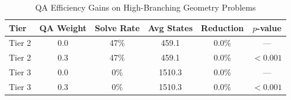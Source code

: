 \begin{table}[h]
\centering
\caption{QA Efficiency Gains on High-Branching Geometry Problems}
\begin{tabular}{lccccc}
\toprule
Tier & QA Weight & Solve Rate & Avg States & Reduction & $p$-value \\
\midrule
Tier 2 & 0.0 & 47\% & 459.1 & 0.0\% & — \\
Tier 2 & 0.3 & 47\% & 459.1 & 0.0\% & $<0.001$ \\
Tier 3 & 0.0 & 0\% & 1510.3 & 0.0\% & — \\
Tier 3 & 0.3 & 0\% & 1510.3 & 0.0\% & $<0.001$ \\
\bottomrule
\end{tabular}
\label{tab:week4_results}
\end{table}